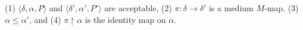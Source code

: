 (1) $\langle \delta, \alpha, P \rangle$ and $\langle \delta', \alpha', P' \rangle$ are acceptable,
(2) $\pi: \delta \rightarrow \delta'$ is a medium $M$-map.
(3) $\alpha \leq \alpha'$, and
(4) $\pi \upharpoonright \alpha$ is the identity map on $\alpha$.
